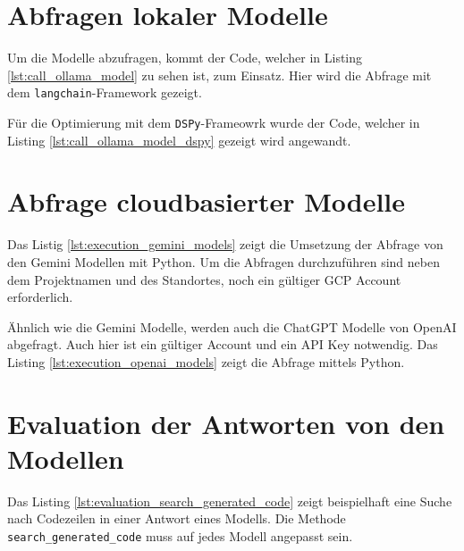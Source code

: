 \newpage
\section{Abfragen lokaler Modelle}
Um die Modelle abzufragen, kommt der Code, welcher in Listing \ref{lst:call_ollama_model} zu sehen ist, zum Einsatz. Hier wird die Abfrage mit dem \texttt{langchain}-Framework gezeigt.\vspace{0.2cm}



\newpage

Für die Optimierung mit dem \texttt{DSPy}-Frameowrk wurde der Code, welcher in Listing \ref{lst:call_ollama_model_dspy} gezeigt wird angewandt.




\newpage
\section{Abfrage cloudbasierter Modelle}
Das Listig \ref{lst:execution_gemini_models} zeigt die Umsetzung der Abfrage von den Gemini Modellen mit Python. Um die Abfragen durchzuführen sind neben dem Projektnamen und des Standortes, noch ein gültiger GCP Account erforderlich.



\newpage

Ähnlich wie die Gemini Modelle, werden auch die ChatGPT Modelle von OpenAI abgefragt. Auch hier ist ein gültiger Account und ein API Key notwendig. Das Listing \ref{lst:execution_openai_models} zeigt die Abfrage mittels Python.



\newpage
\section{Evaluation der Antworten von den Modellen}
Das Listing \ref{lst:evaluation_search_generated_code} zeigt beispielhaft eine Suche nach Codezeilen in einer Antwort eines Modells. Die Methode \texttt{search\_generated\_code} muss auf jedes Modell angepasst sein.

